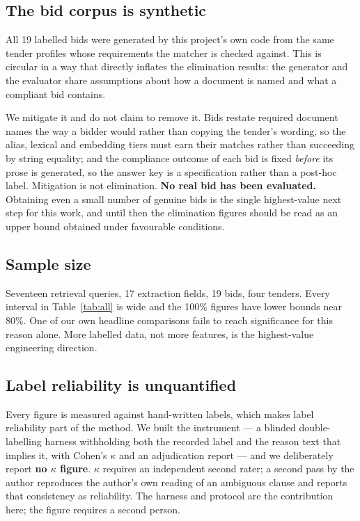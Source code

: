 \documentclass[conference]{IEEEtran}
\begin{document}
\subsection{The bid corpus is synthetic}

All 19 labelled bids were generated by this project's own code from the same
tender profiles whose requirements the matcher is checked against. This is
circular in a way that directly inflates the elimination results: the generator
and the evaluator share assumptions about how a document is named and what a
compliant bid contains.

We mitigate it and do not claim to remove it. Bids restate required document
names the way a bidder would rather than copying the tender's wording, so the
alias, lexical and embedding tiers must earn their matches rather than
succeeding by string equality; and the compliance outcome of each bid is fixed
\emph{before} its prose is generated, so the answer key is a specification
rather than a post-hoc label. Mitigation is not elimination. \textbf{No real
bid has been evaluated.} Obtaining even a small number of genuine bids is the
single highest-value next step for this work, and until then the elimination
figures should be read as an upper bound obtained under favourable conditions.

\subsection{Sample size}

Seventeen retrieval queries, 17 extraction fields, 19 bids, four tenders. Every
interval in Table~\ref{tab:all} is wide and the 100\% figures have lower bounds
near 80\%. One of our own headline comparisons fails to reach significance for
this reason alone. More labelled data, not more features, is the highest-value
engineering direction.

\subsection{Label reliability is unquantified}

Every figure is measured against hand-written labels, which makes label
reliability part of the method. We built the instrument --- a blinded
double-labelling harness withholding both the recorded label and the reason text
that implies it, with Cohen's $\kappa$ and an adjudication report --- and we
deliberately report \textbf{no $\kappa$ figure}. $\kappa$ requires an
independent second rater; a second pass by the author reproduces the author's
own reading of an ambiguous clause and reports that consistency as reliability.
The harness and protocol are the contribution here; the figure requires a second
person.
\end{document}
